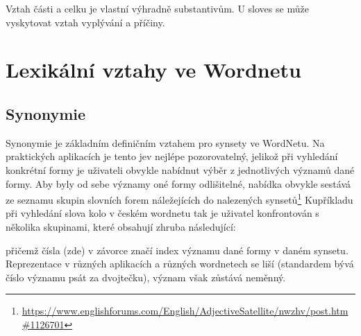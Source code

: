 \documentclass[a4paper, 11pt, oneside]{book}
\newcommand{\td}[2][]{
	{\hskip -0.5em\todo[size=\footnotesize]{#2}}
}
\newcommand\ex{\textsf}
\begin{document}
					Vztah části a celku je vlastní výhradně substantivům. U sloves se může vyskytovat vztah vyplývání a příčiny.



			\section{Lexikální vztahy ve Wordnetu}
			\label{cha:lexvztah}

				\subsection{Synonymie}
				\label{cha:synon}

					Synonymie je základním definičním vztahem pro synsety ve WordNetu. Na praktických aplikacích je tento jev nejlépe pozorovatelný, jelikož při vyhledání konkrétní formy je uživateli obvykle nabídnut výběr z jednotlivých významů dané formy. Aby byly od sebe významy oné formy odlišitelné, nabídka obvykle sestává ze seznamu skupin slovních forem náležejících do nalezených synsetů\footnote{\url{https://www.englishforums.com/English/AdjectiveSatellite/nwzhv/post.htm#1126701}} Kupříkladu při vyhledání slova \ex{kolo} v českém wordnetu tak je uživatel konfrontován s několika skupinami, které obsahují zhruba následující:


					přičemž čísla (zde) v závorce značí index významu dané formy v daném synsetu. \parencite{pala2004building} Reprezentace v různých aplikacích a různých wordnetech se liší (standardem bývá číslo významu psát za dvojtečku), význam však zůstává neměnný. 
\end{document}
